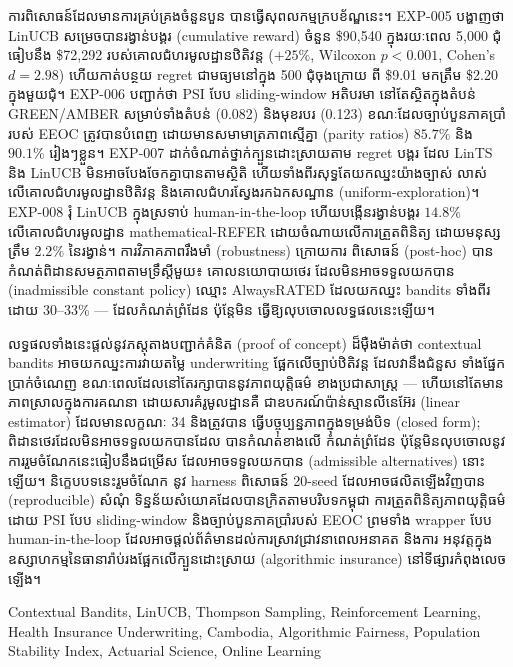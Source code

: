ការពិសោធន៍ដែលមានការគ្រប់គ្រងចំនួនបួន បានធ្វើសុពលកម្មក្របខ័ណ្ឌនេះ។ EXP-005 បង្ហាញថា LinUCB សម្រេចបានរង្វាន់បង្គរ (cumulative reward) ចំនួន \$90{,}540 ក្នុងរយៈពេល 5{,}000 ជុំ ធៀបនឹង \$72{,}292 របស់គោលជំហរមូលដ្ឋានឋិតិវន្ត ($+25\%$, Wilcoxon $p < 0.001$, Cohen's $d = 2.98$) ហើយកាត់បន្ថយ regret ជាមធ្យមនៅក្នុង 500 ជុំចុងក្រោយ ពី \$9.01 មកត្រឹម \$2.20 ក្នុងមួយជុំ។ EXP-006 បញ្ជាក់ថា PSI បែប sliding-window អតិបរមា នៅតែស្ថិតក្នុងតំបន់ GREEN/AMBER សម្រាប់ទាំងតំបន់ (0.082) និងមុខរបរ (0.123) ខណៈដែលច្បាប់បួនភាគប្រាំរបស់ EEOC ត្រូវបានបំពេញ ដោយមានសមាមាត្រភាពស្មើគ្នា (parity ratios) $85.7\%$ និង $90.1\%$ រៀងៗខ្លួន។ EXP-007 ដាក់ចំណាត់ថ្នាក់ក្បួនដោះស្រាយតាម regret បង្គរ ដែល LinTS និង LinUCB មិនអាចបែងចែកគ្នាបានតាមស្ថិតិ ហើយទាំងពីរសុទ្ធតែយកឈ្នះយ៉ាងច្បាស់ លាស់លើគោលជំហរមូលដ្ឋានឋិតិវន្ត និងគោលជំហរស្វែងរកឯកសណ្ឋាន (uniform-exploration)។ EXP-008 រុំ LinUCB ក្នុងស្រទាប់ human-in-the-loop ហើយបង្កើនរង្វាន់បង្គរ $14.8\%$ លើគោលជំហរមូលដ្ឋាន mathematical-REFER ដោយចំណាយលើការត្រួតពិនិត្យ ដោយមនុស្សត្រឹម $2.2\%$ នៃរង្វាន់។ ការវិភាគភាពរឹងមាំ (robustness) ក្រោយការ ពិសោធន៍ (post-hoc) បានកំណត់ពិដានសមត្ថភាពតាមទ្រឹស្តីមួយ៖ គោលនយោបាយថេរ ដែលមិនអាចទទួលយកបាន (inadmissible constant policy) ឈ្មោះ AlwaysRATED ដែលយកឈ្នះ bandits ទាំងពីរដោយ 30--33\% --- ដែលកំណត់ព្រំដែន ប៉ុន្តែមិន ធ្វើឱ្យលុបចោលលទ្ធផលនេះឡើយ។

លទ្ធផលទាំងនេះផ្តល់នូវភស្តុតាងបញ្ជាក់គំនិត (proof of concept) ដ៏ម៉ឺងម៉ាត់ថា contextual bandits អាចយកឈ្នះការវាយតម្លៃ underwriting ផ្អែកលើច្បាប់ឋិតិវន្ត ដែលវានឹងជំនួស ទាំងផ្នែកប្រាក់ចំណេញ ខណៈពេលដែលនៅតែរក្សាបាននូវភាពយុត្តិធម៌ ខាងប្រជាសាស្ត្រ --- ហើយនៅតែមានភាពស្រាលក្នុងការគណនា ដោយសារគំរូមូលដ្ឋានគឺ ជាឧបករណ៍ប៉ាន់ស្មានលីនេអ៊ែរ (linear estimator) ដែលមានលក្ខណៈ 34 និងត្រូវបាន ធ្វើបច្ចុប្បន្នភាពក្នុងទម្រង់បិទ (closed form); ពិដានថេរដែលមិនអាចទទួលយកបានដែល បានកំណត់ខាងលើ កំណត់ព្រំដែន ប៉ុន្តែមិនលុបចោលនូវការរួមចំណែកនេះធៀបនឹងជម្រើស ដែលអាចទទួលយកបាន (admissible alternatives) នោះឡើយ។ និក្ខេបបទនេះរួមចំណែក នូវ harness ពិសោធន៍ 20-seed ដែលអាចផលិតឡើងវិញបាន (reproducible) សំណុំ ទិន្នន័យសំយោគដែលបានក្រិតតាមបរិបទកម្ពុជា ការត្រួតពិនិត្យភាពយុត្តិធម៌ដោយ PSI បែប sliding-window និងច្បាប់បួនភាគប្រាំរបស់ EEOC ព្រមទាំង wrapper បែប human-in-the-loop ដែលអាចផ្តល់ព័ត៌មានដល់ការស្រាវជ្រាវនាពេលអនាគត និងការ អនុវត្តក្នុងឧស្សាហកម្មនៃធានារ៉ាប់រងផ្អែកលើក្បួនដោះស្រាយ (algorithmic insurance) នៅទីផ្សារកំពុងលេចឡើង។

\bigskip
{} Contextual Bandits, LinUCB, Thompson Sampling, Reinforcement Learning, Health Insurance Underwriting, Cambodia, Algorithmic Fairness, Population Stability Index, Actuarial Science, Online Learning
\endgroup
